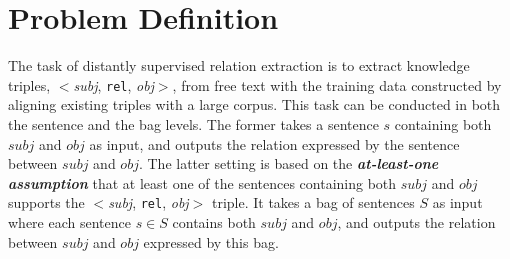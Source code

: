 \section{Problem Definition}
The task of distantly supervised relation extraction is to extract knowledge triples, $<$\emph{subj}, \texttt{rel}, \emph{obj}$>$, from free text with the training data constructed by aligning existing \KB triples with a large corpus.
This task can be conducted in both the sentence and the bag levels.
The former  takes a sentence $s$ containing both $subj$ and $obj$ as input, and outputs the relation expressed
by the sentence between $subj$ and $obj$.
The latter setting is based on the \textit{\textbf{at-least-one assumption}}
that at least one of the sentences containing both $subj$ and $obj$ supports the $<$\emph{subj}, \texttt{rel}, \emph{obj}$>$ triple.
 It takes a bag of sentences $S$ as input where each sentence
$s\in S$ contains both $subj$ and
$obj$, and outputs  the relation between $subj$ and $obj$ expressed by this bag.

%
%
%
%









